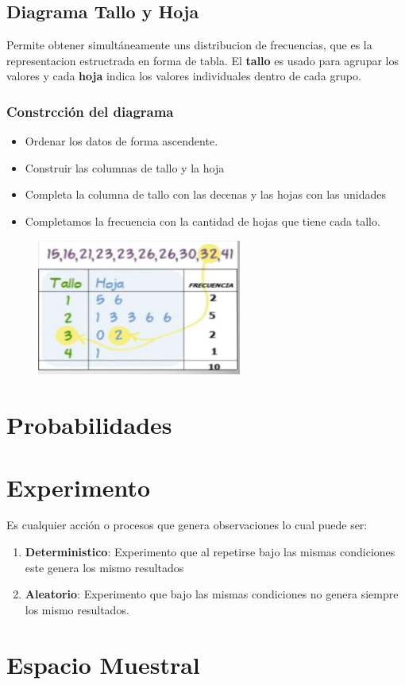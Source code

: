 \documentclass{article}
\begin{document}
    \subsection{Diagrama Tallo y Hoja}
        Permite obtener simultáneamente uns distribucion de frecuencias, que es la representacion estructrada en forma de tabla. El \textbf{tallo} es usado para agrupar los valores y cada \textbf{hoja} indica los valores individuales dentro de cada grupo.
        \subsubsection{Constrcción del diagrama}
            \begin{itemize}
                \item Ordenar los datos de forma ascendente.
                \item Construir las columnas de tallo y la hoja
                \item Completa la columna de tallo con las decenas y las hojas con las unidades
                \item Completamos la frecuencia con la cantidad de hojas que tiene cada tallo.
            \end{itemize}
            \begin{figure}[H]
                \centering
                \includegraphics[width=0.6\textwidth]{img/tallo.png}
            \end{figure}

\section{Probabilidades}
    \section{Experimento}
        Es cualquier acción o procesos que genera observaciones lo cual puede ser:
        \begin{enumerate}
            \item\textbf{Deterministico}: Experimento que al repetirse bajo las mismas condiciones este genera los mismo resultados
            \item \textbf{Aleatorio}: Experimento que bajo las mismas condiciones no genera siempre los mismo resultados.
        \end{enumerate}
    \section{Espacio Muestral}
\end{document}
